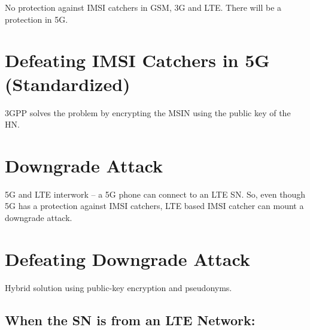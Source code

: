 \documentclass[portrait,a0]{a0poster}
\begin{document}
\begin{multicols}{2}
\begin{center}
    
\end{center}

\begin{Large}
No protection against IMSI catchers in GSM, 3G and LTE. There will be a protection in 5G.
\end{Large}




\section{Defeating IMSI Catchers in 5G (Standardized)}
3GPP solves the problem by encrypting the MSIN using the public key of the HN.


\begin{center}
    
\end{center}



\section{Downgrade Attack}

\begin{Large}
5G and LTE interwork -- a 5G phone can connect to an LTE SN. So, even though 5G has a protection against IMSI catchers, LTE based IMSI catcher can mount a downgrade attack. 
\end{Large}



%    


\section{Defeating Downgrade Attack}


 \begin{Large}
 Hybrid solution using public-key encryption and pseudonyms. 
 \end{Large}
 
 \subsection*{When the SN is from an LTE Network:}
 
 



\end{multicols}
\end{document}
